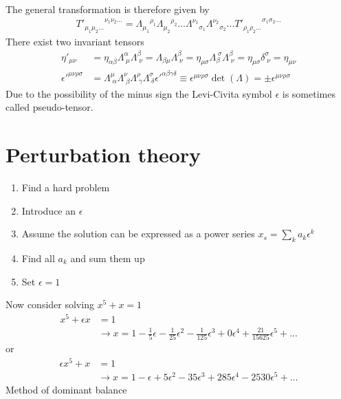 \documentclass[10pt,a4paper]{book}
\theoremstyle{definition}
\begin{document}
The general transformation is therefore given by
\begin{align}
    {T'_{\mu_1\mu_2...}}^{\nu_1\nu_2...}={\Lambda_{\mu_1}}^{\rho_1}{\Lambda_{\mu_2}}^{\rho_2}... {\Lambda^{\nu_1}}_{\sigma_1}{\Lambda^{\nu_2}}_{\sigma_2}... {T'_{\rho_1\rho_2...}}^{\sigma_1\sigma_2...}
\end{align}
There exist two invariant tensors
\begin{align}
    \eta'_{\mu\nu} 
    &=\eta_{\alpha\beta}\Lambda^\alpha_{\;\mu} \Lambda^\beta_{\;\nu}
    =\Lambda_{\beta\mu} \Lambda^\beta_{\;\nu}
    =\eta_{\mu\sigma}\Lambda_{\beta}^{\;\sigma} \Lambda^\beta_{\;\nu}
    =\eta_{\mu\sigma}\delta^\sigma_{\;\nu}
    =\eta_{\mu\nu}\\
    {\epsilon'}^{\mu\nu\rho\sigma}
    &=\Lambda^\mu_{\;\alpha}\Lambda^\nu_{\;\beta}\Lambda^\rho_{\;\gamma}\Lambda^\sigma_{\;\delta}{\epsilon'}^{\alpha\beta\gamma\delta}\equiv \epsilon^{\mu\nu\rho\sigma} \det(\Lambda)=\pm \epsilon^{\mu\nu\rho\sigma}
\end{align}
Due to the possibility of the minus sign the Levi-Civita symbol $\epsilon$ is sometimes called pseudo-tensor.

\section{Perturbation theory}

\begin{enumerate}
\item Find a hard problem
\item Introduce an $\epsilon$
\item Assume the solution can be expressed as a power series $x_s=\sum_k a_k\epsilon^k$
\item Find all $a_k$ and sum them up
\item Set $\epsilon=1$
\end{enumerate}
Now consider solving $x^5+x=1$
\begin{align}
x^5+\epsilon x&=1\\
&\rightarrow x=1-\frac{1}{5}\epsilon-\frac{1}{25}\epsilon^2-\frac{1}{125}\epsilon^3+0\epsilon^4+\frac{21}{15625}\epsilon^5+...
\end{align}
or
\begin{align}
\epsilon x^5+x&=1\\
&\rightarrow x=1-\epsilon+5\epsilon^2-35\epsilon^3+285\epsilon^4-2530\epsilon^5+...
\end{align}
Method of dominant balance
\end{document}
